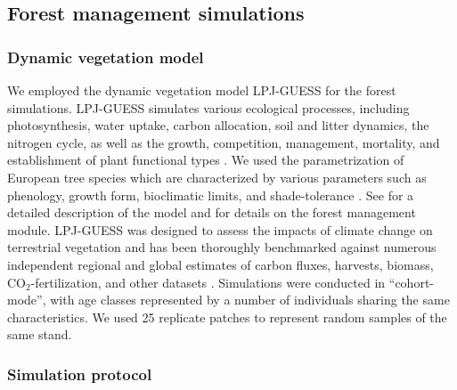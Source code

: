 \documentclass[]{article}
\newcommand{\coo}{\ensuremath{\mathrm{CO_2}}}
\begin{document}
\subsection{Forest management simulations}

\subsubsection{Dynamic vegetation model}

We employed the dynamic vegetation model LPJ-GUESS for the forest simulations. LPJ-GUESS simulates various ecological processes, including photosynthesis, water uptake, carbon allocation, soil and litter dynamics, the nitrogen cycle, as well as the growth, competition, management, mortality, and establishment of plant functional types \parencite{Haxeltine1996, Smith2014, Sitch2003, Smith2001, Lindeskog2021}. We used the parametrization of European tree species which are characterized by various parameters such as phenology, growth form, bioclimatic limits, and shade-tolerance \parencite{Hickler2012}.
See \textcite{Smith2014} for a detailed description of the model and \textcite{Lindeskog2021} for details on the forest management module.
LPJ-GUESS was designed to assess the impacts of climate change on terrestrial vegetation and has been thoroughly benchmarked against numerous independent regional and global estimates of carbon fluxes, harvests, biomass, \coo{}-fertilization, and other datasets \parencite{Chang2017, Haverd2020, Ito2017, Lindeskog2021, Friedlingstein2022}.
Simulations were conducted in ``cohort-mode'', with age classes represented by a number of individuals sharing the same characteristics. We used 25 replicate patches to represent random samples of the same stand.



\subsubsection{Simulation protocol}
\end{document}

